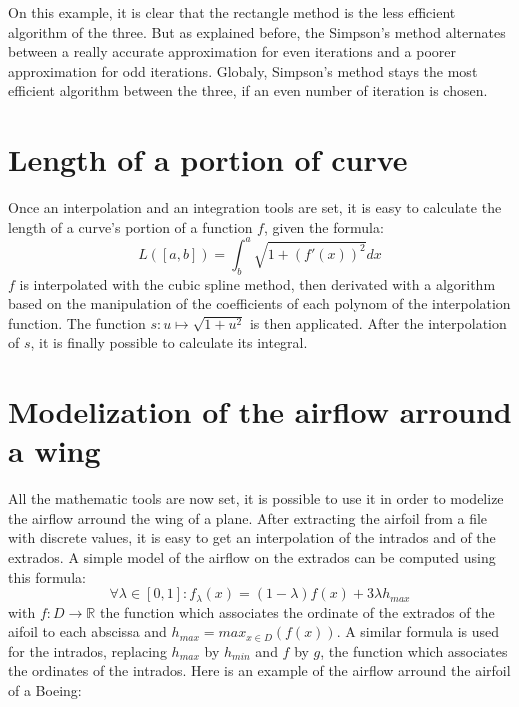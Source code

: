 \documentclass{article}
\begin{document}
On this example, it is clear that the rectangle method is the less efficient algorithm of the three. But as explained before, the Simpson's method alternates between a really accurate approximation for even iterations and a poorer approximation for odd iterations. Globaly, Simpson's method stays the most efficient algorithm between the three, if an even number of iteration is chosen.

\section{Length of a portion of curve}

Once an interpolation and an integration tools are set, it is easy to calculate the length of a curve's portion of a function $f$, given the formula:
\begin{equation}
  L([a, b]) = \int^a_b{\sqrt{1 + (f'(x))^2} dx}
\end{equation} 
$f$ is interpolated with the cubic spline method, then derivated with a algorithm based on the manipulation of the coefficients of each polynom of the interpolation function. The function $s: u \mapsto \sqrt{1 + u^2}$ is then applicated. After the interpolation of $s$, it is finally possible to calculate its integral.

\section{Modelization of the airflow arround a wing}

All the mathematic tools are now set, it is possible to use it in order to modelize the airflow arround the wing of a plane. After extracting the airfoil from a file with discrete values, it is easy to get an interpolation of the intrados and of the extrados. A simple model of the airflow on the extrados can be computed using this formula:
\begin{equation}
\forall \lambda \in [0,1]: f_{\lambda}(x) = (1-\lambda)f(x) + 3\lambda h_{max}
\end{equation}
with $f: D \to \mathbb{R}$ the function which associates the ordinate of the extrados of the aifoil to each abscissa and $h_{max} = max_{x \in D}(f(x))$. A similar formula is used for the intrados, replacing $h_{max}$ by $h_{min}$ and $f$ by $g$, the function which associates the ordinates of the intrados. Here is an example of the airflow arround the airfoil of a Boeing:
\end{document}

